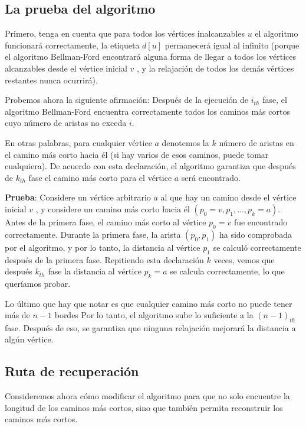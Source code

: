 \subsection{La prueba del algoritmo}

Primero, tenga en cuenta que para todos los vértices inalcanzables $u$ el algoritmo funcionará correctamente, la etiqueta $d[u]$ permanecerá igual al infinito (porque el algoritmo Bellman-Ford encontrará alguna forma de llegar a todos los vértices alcanzables desde el vértice inicial $v$ , y la relajación de todos los demás vértices restantes nunca ocurrirá).

Probemos ahora la siguiente afirmación: Después de la ejecución de $i_{th}$ fase, el algoritmo Bellman-Ford encuentra correctamente todos los caminos más cortos cuyo número de aristas no exceda $i$.

En otras palabras, para cualquier vértice $a$ denotemos la $k$ número de aristas en el camino más corto hacia él (si hay varios de esos caminos, puede tomar cualquiera). De acuerdo con esta declaración, el algoritmo garantiza que después de $k_{th}$ fase el camino más corto para el vértice $a$ será encontrado.

\textbf{Prueba}: Considere un vértice arbitrario $a$ al que hay un camino desde el vértice inicial 
$v$ , y considere un camino más corto hacia él $(p_0=v, p_1, \ldots, p_k=a)$. Antes de la primera 
fase, el camino más corto al vértice $p_0 = v$ fue encontrado correctamente. Durante la primera 
fase, la arista $(p_0,p_1)$ ha sido comprobada por el algoritmo, y por lo tanto, la distancia al 
vértice $p_1$ se calculó correctamente después de la primera fase. Repitiendo esta declaración $k$ veces, vemos que después $k_{th}$ fase la distancia al vértice $p_k = a$ se calcula correctamente, 
lo que queríamos probar.

Lo último que hay que notar es que cualquier camino más corto no puede tener más de $n - 1$ bordes Por lo tanto, el algoritmo sube lo suficiente a la $(n-1)_{th}$ fase. Después de eso, se garantiza que ninguna relajación mejorará la distancia a algún vértice.

\subsection{Ruta de recuperación}

Consideremos ahora cómo modificar el algoritmo para que no solo encuentre la longitud de los caminos más cortos, sino que también permita reconstruir los caminos más cortos.


